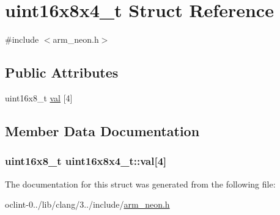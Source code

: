 \hypertarget{structuint16x8x4__t}{\section{uint16x8x4\-\_\-t Struct Reference}
\label{structuint16x8x4__t}
}


{\ttfamily \#include $<$arm\-\_\-neon.\-h$>$}

\subsection*{Public Attributes}
\begin{DoxyCompactItemize}
\item 
uint16x8\-\_\-t \hyperlink{structuint16x8x4__t_ad85378b41567a3fabbb10ef1e9eccd32}{val} \mbox{[}4\mbox{]}
\end{DoxyCompactItemize}


\subsection{Member Data Documentation}
\hypertarget{structuint16x8x4__t_ad85378b41567a3fabbb10ef1e9eccd32}{
\subsubsection[{val}]{\setlength{\rightskip}{0pt plus 5cm}uint16x8\-\_\-t uint16x8x4\-\_\-t\-::val\mbox{[}4\mbox{]}}}\label{structuint16x8x4__t_ad85378b41567a3fabbb10ef1e9eccd32}


The documentation for this struct was generated from the following file\-:\begin{DoxyCompactItemize}
\item 
oclint-\/0../lib/clang/3../include/\hyperlink{arm__neon_8h}{arm\-\_\-neon.\-h}\end{DoxyCompactItemize}
